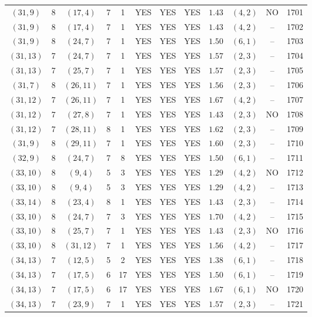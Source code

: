 \begin{longtable}{|c|c|c|c|c|c|c|c|c|c|c|c|}
$(31,9)$ & 8 & $(17,4)$ & 7 & 1 & YES & YES & YES & $1.43$ & $(4,2)$ & NO & 1701\\
$(31,9)$ & 8 & $(17,4)$ & 7 & 1 & YES & YES & YES & $1.43$ & $(4,2)$ & -- & 1702\\
$(31,9)$ & 8 & $(24,7)$ & 7 & 1 & YES & YES & YES & $1.50$ & $(6,1)$ & -- & 1703\\
$(31,13)$ & 7 & $(24,7)$ & 7 & 1 & YES & YES & YES & $1.57$ & $(2,3)$ & -- & 1704\\
$(31,13)$ & 7 & $(25,7)$ & 7 & 1 & YES & YES & YES & $1.57$ & $(2,3)$ & -- & 1705\\
$(31,7)$ & 8 & $(26,11)$ & 7 & 1 & YES & YES & YES & $1.56$ & $(2,3)$ & -- & 1706\\
$(31,12)$ & 7 & $(26,11)$ & 7 & 1 & YES & YES & YES & $1.67$ & $(4,2)$ & -- & 1707\\
$(31,12)$ & 7 & $(27,8)$ & 7 & 1 & YES & YES & YES & $1.43$ & $(2,3)$ & NO & 1708\\
$(31,12)$ & 7 & $(28,11)$ & 8 & 1 & YES & YES & YES & $1.62$ & $(2,3)$ & -- & 1709\\
$(31,9)$ & 8 & $(29,11)$ & 7 & 1 & YES & YES & YES & $1.60$ & $(2,3)$ & -- & 1710\\
$(32,9)$ & 8 & $(24,7)$ & 7 & 8 & YES & YES & YES & $1.50$ & $(6,1)$ & -- & 1711\\
$(33,10)$ & 8 & $(9,4)$ & 5 & 3 & YES & YES & YES & $1.29$ & $(4,2)$ & NO & 1712\\
$(33,10)$ & 8 & $(9,4)$ & 5 & 3 & YES & YES & YES & $1.29$ & $(4,2)$ & -- & 1713\\
$(33,14)$ & 8 & $(23,4)$ & 8 & 1 & YES & YES & YES & $1.43$ & $(2,3)$ & -- & 1714\\
$(33,10)$ & 8 & $(24,7)$ & 7 & 3 & YES & YES & YES & $1.70$ & $(4,2)$ & -- & 1715\\
$(33,10)$ & 8 & $(25,7)$ & 7 & 1 & YES & YES & YES & $1.43$ & $(2,3)$ & NO & 1716\\
$(33,10)$ & 8 & $(31,12)$ & 7 & 1 & YES & YES & YES & $1.56$ & $(4,2)$ & -- & 1717\\
$(34,13)$ & 7 & $(12,5)$ & 5 & 2 & YES & YES & YES & $1.38$ & $(6,1)$ & -- & 1718\\
$(34,13)$ & 7 & $(17,5)$ & 6 & 17 & YES & YES & YES & $1.50$ & $(6,1)$ & -- & 1719\\
$(34,13)$ & 7 & $(17,5)$ & 6 & 17 & YES & YES & YES & $1.67$ & $(6,1)$ & NO & 1720\\
$(34,13)$ & 7 & $(23,9)$ & 7 & 1 & YES & YES & YES & $1.57$ & $(2,3)$ & -- & 1721\\

\end{longtable}
